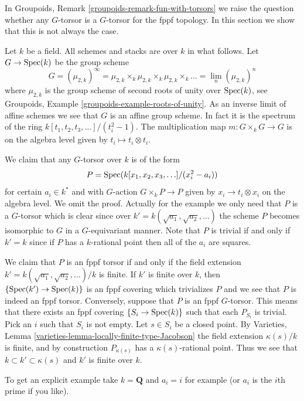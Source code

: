 \noindent
In
Groupoids, Remark \ref{groupoids-remark-fun-with-torsors}
we raise the question whether any $G$-torsor is a $G$-torsor for the
fppf topology. In this section we show that this is not always the case.

\medskip\noindent
Let $k$ be a field. All schemes and stacks are over $k$ in what follows.
Let $G \to \mathop{\mathrm{Spec}}(k)$ be the group scheme
$$
G = (\mu_{2, k})^\infty =
\mu_{2, k} \times_k \mu_{2, k} \times_k \mu_{2, k} \times_k \ldots =
\lim_n (\mu_{2, k})^n
$$
where $\mu_{2, k}$ is the group scheme of second roots of unity over
$\mathop{\mathrm{Spec}}(k)$, see
Groupoids, Example \ref{groupoids-example-roots-of-unity}.
As an inverse limit of affine schemes we see that $G$ is an affine group
scheme. In fact it is the spectrum of the ring
$k[t_1, t_2, t_3, \ldots]/(t_i^2 - 1)$. The multiplication map
$m : G \times_k G \to G$ is on the algebra level given by
$t_i \mapsto t_i \otimes t_i$.

\medskip\noindent
We claim that any $G$-torsor over $k$ is of the form
$$
P = \mathop{\mathrm{Spec}}(k[x_1, x_2, x_3, \ldots]/(x_i^2 - a_i))
$$
for certain $a_i \in k^*$ and with $G$-action $G \times_k P \to P$
given by $x_i \to t_i \otimes x_i$ on the algebra level.
We omit the proof.
Actually for the example we only need that $P$ is a $G$-torsor
which is clear since over $k' = k(\sqrt{a_1}, \sqrt{a_2}, \ldots)$
the scheme $P$ becomes isomorphic to $G$ in a $G$-equivariant manner.
Note that $P$ is trivial if and only if $k' = k$ since if
$P$ has a $k$-rational point then all of the $a_i$ are squares.

\medskip\noindent
We claim that $P$ is an fppf torsor if and only if the field extension
$k' = k(\sqrt{a_1}, \sqrt{a_2}, \ldots)/k$ is finite.
If $k'$ is finite over $k$, then
$\{\mathop{\mathrm{Spec}}(k') \to \mathop{\mathrm{Spec}}(k)\}$
is an fppf covering which trivializes $P$ and we see that $P$ is indeed
an fppf torsor. Conversely, suppose that $P$ is an fppf $G$-torsor.
This means that there exists an fppf covering
$\{S_i \to \mathop{\mathrm{Spec}}(k)\}$ such that each $P_{S_i}$ is trivial.
Pick an $i$ such that $S_i$ is not empty. Let $s \in S_i$ be a closed
point. By
Varieties, Lemma \ref{varieties-lemma-locally-finite-type-Jacobson}
the field extension $\kappa(s)/k$ is finite, and by construction
$P_{\kappa(s)}$ has a $\kappa(s)$-rational point. Thus we see that
$k \subset k' \subset \kappa(s)$ and $k'$ is finite over $k$.

\medskip\noindent
To get an explicit example take $k = \mathbf{Q}$ and $a_i = i$
for example (or $a_i$ is the $i$th prime if you like).

